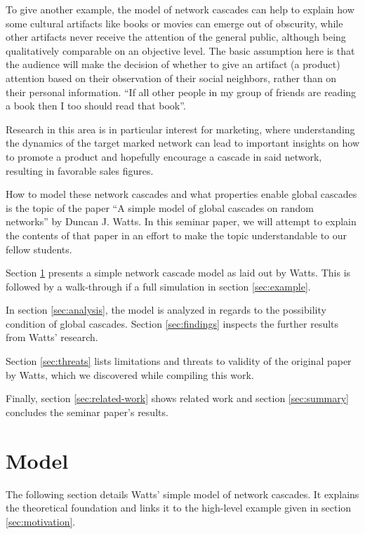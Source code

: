 \documentclass{sig-alternate-05-2015}
\begin{document}
To give another example, the model of network cascades can help to explain how some cultural artifacts like books or movies can emerge out of obscurity, while other artifacts never receive the attention of the general public, although being qualitatively comparable on an objective level. The basic assumption here is that the audience will make the decision of whether to give an artifact (a product) attention based on their observation of their social neighbors, rather than on their personal information. ``If all other people in my group of friends are reading a book then I too should read that book''.

Research in this area is in particular interest for marketing, where understanding the dynamics of the target marked network can lead to important insights on how to promote a product and hopefully encourage a cascade in said network, resulting in favorable sales figures.

How to model these network cascades and what properties enable global cascades is the topic of the paper ``A simple model of global cascades on random networks'' by Duncan J. Watts\cite{simplemodel}. In this seminar paper, we will attempt to explain the contents of that paper in an effort to make the topic understandable to our fellow students.


\par\bigskip

Section \ref{sec:model} presents a simple network cascade model as laid out by Watts\cite{simplemodel}. This is followed by a walk-through if a full simulation in section \ref{sec:example}.

In section \ref{sec:analysis}, the model is analyzed in regards to the possibility condition of global cascades. Section \ref{sec:findings} inspects the further results from Watts' research.

Section \ref{sec:threats} lists limitations and threats to validity of the original paper by Watts, which we discovered while compiling this work.

Finally, section \ref{sec:related-work} shows related work and section \ref{sec:summary} concludes the seminar paper's results.


\section{Model}\label{sec:model}

The following section details Watts' simple model of network cascades\cite{simplemodel}. It explains the theoretical foundation and links it to the high-level example given in section \ref{sec:motivation}.
\end{document}

